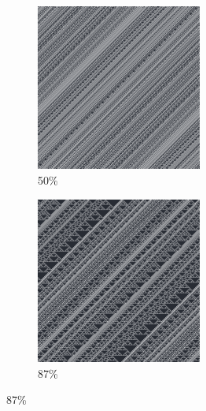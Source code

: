 \documentclass[12pt, fleqn]{report}                             %
\theoremstyle{break}                                            %
\begin{document}
\begin{figure}[ht!]
\begin{subfigure}[b]{0.4\linewidth}
          \includegraphics[width=0.6\textwidth]{Images/26/c.png}
          \caption{50\%}
        \end{subfigure}
        \begin{subfigure}[b]{0.4\linewidth}
          \includegraphics[width=0.6\textwidth]{Images/26/d.png}
          \caption{87\%}
        \end{subfigure}
      \end{figure}
\end{document}
